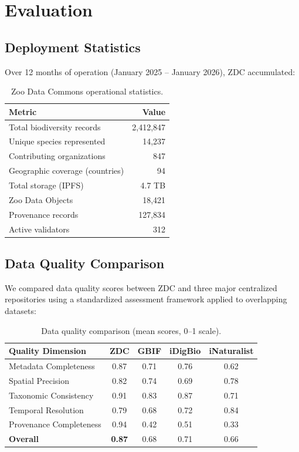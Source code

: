 \documentclass[11pt,a4paper]{article}
\begin{document}
\section{Evaluation}
\label{sec:evaluation}

\subsection{Deployment Statistics}

Over 12 months of operation (January 2025 -- January 2026), ZDC accumulated:

\begin{table}[H]
\centering
\caption{Zoo Data Commons operational statistics.}
\label{tab:stats}
\begin{tabular}{@{}lr@{}}
\toprule
\textbf{Metric} & \textbf{Value} \\
\midrule
Total biodiversity records & 2,412,847 \\
Unique species represented & 14,237 \\
Contributing organizations & 847 \\
Geographic coverage (countries) & 94 \\
Total storage (IPFS) & 4.7 TB \\
Zoo Data Objects & 18,421 \\
Provenance records & 127,834 \\
Active validators & 312 \\
\bottomrule
\end{tabular}
\end{table}

\subsection{Data Quality Comparison}

We compared data quality scores between ZDC and three major centralized repositories using a standardized assessment framework applied to overlapping datasets:

\begin{table}[H]
\centering
\caption{Data quality comparison (mean scores, 0--1 scale).}
\label{tab:quality_comparison}
\begin{tabular}{@{}lcccc@{}}
\toprule
\textbf{Quality Dimension} & \textbf{ZDC} & \textbf{GBIF} & \textbf{iDigBio} & \textbf{iNaturalist} \\
\midrule
Metadata Completeness & 0.87 & 0.71 & 0.76 & 0.62 \\
Spatial Precision & 0.82 & 0.74 & 0.69 & 0.78 \\
Taxonomic Consistency & 0.91 & 0.83 & 0.87 & 0.71 \\
Temporal Resolution & 0.79 & 0.68 & 0.72 & 0.84 \\
Provenance Completeness & 0.94 & 0.42 & 0.51 & 0.33 \\
\midrule
\textbf{Overall} & \textbf{0.87} & 0.68 & 0.71 & 0.66 \\
\bottomrule
\end{tabular}
\end{table}
\end{document}
